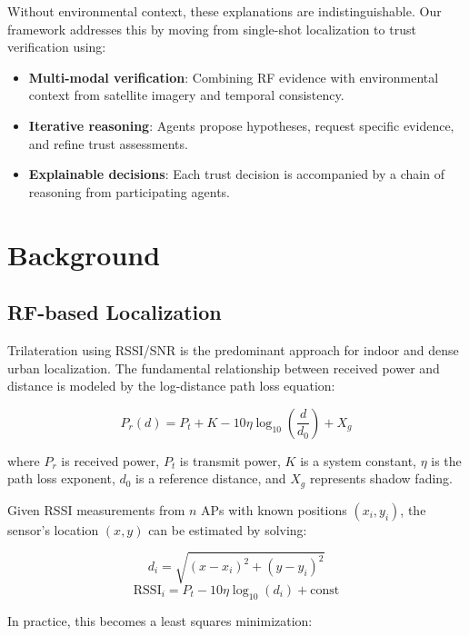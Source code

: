 \documentclass[10pt, twocolumn, letterpaper]{article}
\begin{document}
Without environmental context, these explanations are indistinguishable. Our framework addresses this by moving from single-shot localization to trust verification using:
\begin{itemize}
    \item \textbf{Multi-modal verification}: Combining RF evidence with environmental context from satellite imagery and temporal consistency.
    \item \textbf{Iterative reasoning}: Agents propose hypotheses, request specific evidence, and refine trust assessments.
    \item \textbf{Explainable decisions}: Each trust decision is accompanied by a chain of reasoning from participating agents.
\end{itemize}

\section{Background}

\subsection{RF-based Localization}

Trilateration using RSSI/SNR is the predominant approach for indoor and dense urban localization. The fundamental relationship between received power and distance is modeled by the log-distance path loss equation:

\begin{equation}
P_r(d) = P_t + K - 10\eta \log_{10}\left(\frac{d}{d_0}\right) + X_g
\end{equation}

where $P_r$ is received power, $P_t$ is transmit power, $K$ is a system constant, $\eta$ is the path loss exponent, $d_0$ is a reference distance, and $X_g$ represents shadow fading.

Given RSSI measurements from $n$ APs with known positions $(x_i, y_i)$, the sensor's location $(x,y)$ can be estimated by solving:

\begin{equation}
d_i = \sqrt{(x - x_i)^2 + (y - y_i)^2}
\end{equation}
\begin{equation}
\text{RSSI}_i = P_t - 10\eta \log_{10}(d_i) + \text{const}
\end{equation}

In practice, this becomes a least squares minimization:
\end{document}
